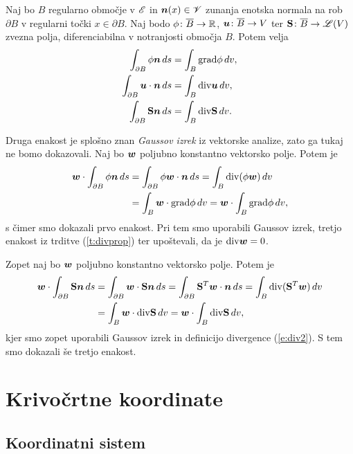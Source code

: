 \begin{izrek} \label{i:divtheo}
	Naj bo $B$ regularno območje v $\mathscr E$ in $\boldsymbol n(x)\in\mathscr V$ zunanja enotska normala
	na rob $\partial B$ v regularni točki $x\in\partial B$. Naj bodo $\phi\colon\overline{B}\to\mathbb R$,
	$\boldsymbol u\colon\overline{B}\to V$ ter $\mathbf S\colon\overline{B}\to\mathscr L(V)$
	zvezna polja, diferenciabilna v notranjosti območja $B$. Potem velja
	\begin{align*}
		\int_{\partial B} \phi\boldsymbol n\,ds &= \int_{B} \mathrm{grad}\phi\,dv, \\
		\int_{\partial B} \boldsymbol u\cdot\boldsymbol n\,ds &= \int_{B} \mathrm{div}\boldsymbol u\,dv, \\
		\int_{\partial B} \mathbf S\boldsymbol n\,ds &= \int_{B} \mathrm{div}\mathbf S\,dv.
	\end{align*}
\end{izrek}
\proof
	Druga enakost je splošno znan \emph{Gaussov izrek} iz vektorske analize, zato ga tukaj ne bomo dokazovali.
	Naj bo $\boldsymbol w$ poljubno konstantno vektorsko polje. Potem je
	\begin{align*}
		\boldsymbol w\cdot\int_{\partial B}\phi\boldsymbol n\,ds &= \int_{\partial B}\phi\boldsymbol w\cdot\boldsymbol n\,ds=
		\int_{B}\mathrm{div}(\phi\boldsymbol w)\,dv \\
		&= \int_{B}\boldsymbol w\cdot\mathrm{grad}\phi \,dv = \boldsymbol w\cdot\int_{B}\mathrm{grad}\phi \,dv,
	\end{align*}
	s čimer smo dokazali prvo enakost.
	Pri tem smo uporabili Gaussov izrek, tretjo enakost iz trditve (\ref{t:divprop}) ter
	upoštevali, da je $\mathrm{div}\boldsymbol w=0$.
	
	Zopet naj bo $\boldsymbol w$ poljubno konstantno vektorsko polje. Potem je
	\begin{align*}
		\boldsymbol w\cdot\int_{\partial B}\mathbf S\boldsymbol n\,ds &= \int_{\partial B}\boldsymbol w\cdot\mathbf S\boldsymbol n\,ds=
		\int_{\partial B}\mathbf S^T\boldsymbol w\cdot\boldsymbol n\,ds=
		\int_{B}\mathrm{div}(\mathbf S^T\boldsymbol w)\,dv \\ &=\int_{B}\boldsymbol w\cdot\mathrm{div}\mathbf S\,dv=
		\boldsymbol w\cdot\int_{B}\mathrm{div}\mathbf S\,dv,
	\end{align*}
	kjer smo zopet uporabili Gaussov izrek in definicijo divergence (\ref{e:div2}). S tem smo dokazali še tretjo enakost.
\endproof


\section{Krivočrtne koordinate} \label{s:koordinate}


\subsection{Koordinatni sistem}


